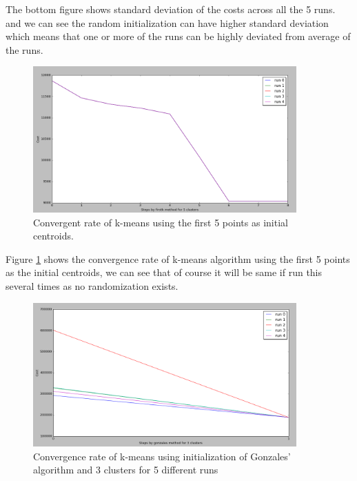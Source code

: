 The bottom figure shows standard deviation of the costs across all the 5 runs. and we can see the random initialization can have higher standard deviation which means that one or more of the runs can be highly deviated from average of the runs.


\begin{figure}[!htb]
\centering
\includegraphics[width=0.9\textwidth]{shots/firstk5clusters.png}
\caption{Convergent rate of k-means using the first 5 points as initial centroids. }
\label{firstk5clusters}
\end{figure}


Figure \ref{firstk5clusters} shows the convergence rate of k-means algorithm using the first 5 points as the initial centroids, we can see that of course it will be same if run this several times as no randomization exists.


\begin{figure}[!htb]
\centering
\includegraphics[width=0.9\textwidth]{shots/gonzales3clusters.png}
\caption{Convergence rate of k-means using initialization of Gonzales' algorithm and 3 clusters for 5 different runs }
\label{gonzales3clusters}
\end{figure}

